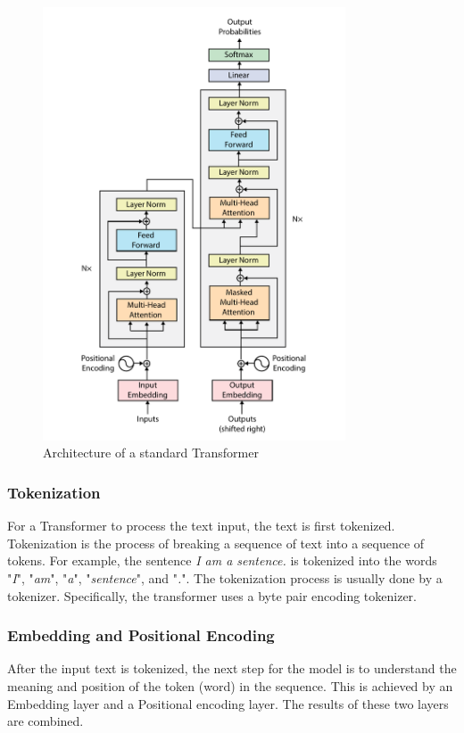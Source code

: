 \begin{figure}[htp]
    \centering
    \includegraphics[width=0.8\textwidth]{figures/transformer_architecture.pdf}
    \caption{Architecture of a standard Transformer \textcite{vaswani2017attention}}
    \label{fig:transformer-architecture}
\end{figure}


\subsubsection{Tokenization}
\label{sec:tokenization}
For a Transformer to process the text input, the text is first tokenized. Tokenization is the process of breaking a sequence of text into a sequence of tokens. For example, the sentence \textit{I am a sentence.} is tokenized into the words "\textit{I}", "\textit{am}", "\textit{a}", "\textit{sentence}", and "\textit{.}". The tokenization process is usually done by a tokenizer. Specifically, the transformer uses a byte pair encoding tokenizer.

\subsubsection{Embedding and Positional Encoding}
\label{sec:embedding-and-positional-encoding}
After the input text is tokenized, the next step for the model is to understand the meaning and position of the token (word) in the sequence. This is achieved by an Embedding layer and a Positional encoding layer. The results of these two layers are combined.

